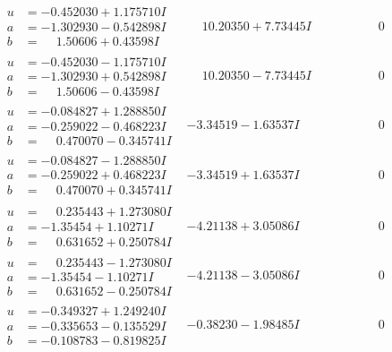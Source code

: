 \documentclass[1p]{elsarticle_modified}
\theoremstyle{definition}
\begin{document}
$$\begin{array}{c|c|c}
\begin{aligned}
u &= -0.452030 + 1.175710 I \\
a &= -1.302930 - 0.542898 I \\
b &= \phantom{-}1.50606 + 0.43598 I\end{aligned}
 & \phantom{-}10.20350 + 7.73445 I & \phantom{-0.000000 } 0 \\ \hline\begin{aligned}
u &= -0.452030 - 1.175710 I \\
a &= -1.302930 + 0.542898 I \\
b &= \phantom{-}1.50606 - 0.43598 I\end{aligned}
 & \phantom{-}10.20350 - 7.73445 I & \phantom{-0.000000 } 0 \\ \hline\begin{aligned}
u &= -0.084827 + 1.288850 I \\
a &= -0.259022 - 0.468223 I \\
b &= \phantom{-}0.470070 - 0.345741 I\end{aligned}
 & -3.34519 - 1.63537 I & \phantom{-0.000000 } 0 \\ \hline\begin{aligned}
u &= -0.084827 - 1.288850 I \\
a &= -0.259022 + 0.468223 I \\
b &= \phantom{-}0.470070 + 0.345741 I\end{aligned}
 & -3.34519 + 1.63537 I & \phantom{-0.000000 } 0 \\ \hline\begin{aligned}
u &= \phantom{-}0.235443 + 1.273080 I \\
a &= -1.35454 + 1.10271 I \\
b &= \phantom{-}0.631652 + 0.250784 I\end{aligned}
 & -4.21138 + 3.05086 I & \phantom{-0.000000 } 0 \\ \hline\begin{aligned}
u &= \phantom{-}0.235443 - 1.273080 I \\
a &= -1.35454 - 1.10271 I \\
b &= \phantom{-}0.631652 - 0.250784 I\end{aligned}
 & -4.21138 - 3.05086 I & \phantom{-0.000000 } 0 \\ \hline\begin{aligned}
u &= -0.349327 + 1.249240 I \\
a &= -0.335653 - 0.135529 I \\
b &= -0.108783 - 0.819825 I\end{aligned}
 & -0.38230 - 1.98485 I & \phantom{-0.000000 } 0 \\ \hline\begin{aligned}

\end{aligned}
\end{array}$$
\end{document}
